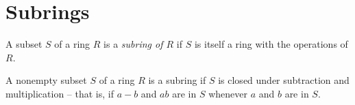 \section{Subrings}

\begin{definition}[Subring]
	A subset $S$ of a ring $R$ is a \textit{subring of $R$} if $S$ is itself a ring with the operations of $R$.
\end{definition}

\begin{theorem}
	A nonempty subset $S$ of a ring $R$ is a subring if $S$ is closed under subtraction and multiplication -- that is, if $a - b$ and $ab$ are in $S$ whenever $a$ and $b$ are in $S$.
\end{theorem}
